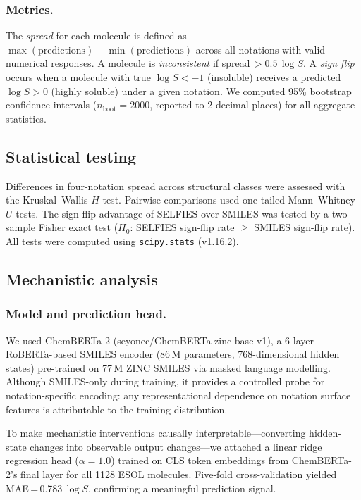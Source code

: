 \documentclass[twoside,twocolumn,9pt]{article}
\newcommand{\logS}{\ensuremath{\log S}}
\begin{document}
\subsubsection{Metrics.~~} The \textit{spread} for each molecule is defined as $\max(\text{predictions}) - \min(\text{predictions})$ across all notations with valid numerical responses. A molecule is \textit{inconsistent} if spread\,$>0.5$\,$\logS$. A \textit{sign flip} occurs when a molecule with true $\logS < -1$ (insoluble) receives a predicted $\logS > 0$ (highly soluble) under a given notation. We computed 95\% bootstrap confidence intervals ($n_\text{boot}=2000$, reported to 2 decimal places) for all aggregate statistics.

\subsection{Statistical testing}

Differences in four-notation spread across structural classes were assessed with the Kruskal--Wallis $H$-test. Pairwise comparisons used one-tailed Mann--Whitney $U$-tests. The sign-flip advantage of SELFIES over SMILES was tested by a two-sample Fisher exact test ($H_0$: SELFIES sign-flip rate $\geq$ SMILES sign-flip rate). All tests were computed using \texttt{scipy.stats} (v1.16.2).

\subsection{Mechanistic analysis}

\subsubsection{Model and prediction head.~~} We used ChemBERTa-2 (seyonec/ChemBERTa-zinc-base-v1),\cite{ahmad2022} a 6-layer RoBERTa-based SMILES encoder (86\,M parameters, 768-dimensional hidden states) pre-trained on 77\,M ZINC SMILES\cite{irwin2012} via masked language modelling. Although SMILES-only during training, it provides a controlled probe for notation-specific encoding: any representational dependence on notation surface features is attributable to the training distribution.

To make mechanistic interventions causally interpretable---converting hidden-state changes into observable output changes---we attached a linear ridge regression head ($\alpha=1.0$) trained on CLS token embeddings from ChemBERTa-2's final layer for all 1128 ESOL molecules. Five-fold cross-validation yielded MAE\,=\,0.783\,$\logS$, confirming a meaningful prediction signal.
\end{document}
